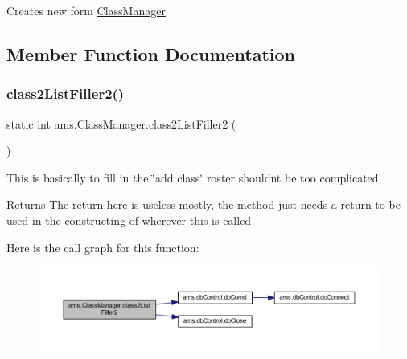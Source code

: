 Creates new form \mbox{\hyperlink{classams_1_1_class_manager}{Class\+Manager}} 

\subsection{Member Function Documentation}
\mbox{\label{classams_1_1_class_manager_a0c0987f97d77198e6781fbbc6586b76b}} 
\subsubsection{\texorpdfstring{class2ListFiller2()}{class2ListFiller2()}}
{\footnotesize\ttfamily static int ams.\+Class\+Manager.\+class2\+List\+Filler2 (\begin{DoxyParamCaption}{ }\end{DoxyParamCaption})\hspace{0.3cm}{\ttfamily [static]}}

This is basically to fill in the \char`\"{}add class\char`\"{} roster shouldn\textquotesingle{}t be too complicated \begin{DoxyReturn}{Returns}
The return here is useless mostly, the method just needs a return to be used in the constructing of wherever this is called 
\end{DoxyReturn}
Here is the call graph for this function\+:\nopagebreak
\begin{figure}[H]
\begin{center}
\leavevmode
\includegraphics[width=350pt]{classams_1_1_class_manager_a0c0987f97d77198e6781fbbc6586b76b_cgraph}
\end{center}
\end{figure}
\mbox{\label{classams_1_1_class_manager_a9b0924e9fc08323cf6a91bea96f8f398}} 
